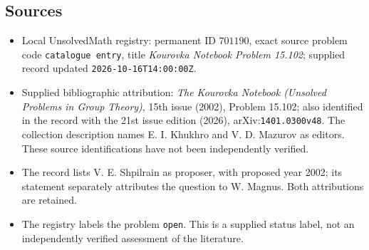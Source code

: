 \documentclass[11pt]{article}
\begin{document}
\subsection{Sources}
\begin{itemize}
\item Local UnsolvedMath registry: permanent ID \(701190\), exact source problem code \texttt{catalogue entry}, title \emph{Kourovka Notebook Problem 15.102}; supplied record updated \texttt{2026-10-16T14:00:00Z}.
\item Supplied bibliographic attribution: \emph{The Kourovka Notebook (Unsolved Problems in Group Theory)}, 15th issue (2002), Problem 15.102; also identified in the record with the 21st issue edition (2026), arXiv:\texttt{1401.0300v48}. The collection description names E. I. Khukhro and V. D. Mazurov as editors. These source identifications have not been independently verified.
\item The record lists V. E. Shpilrain as proposer, with proposed year 2002; its statement separately attributes the question to W. Magnus. Both attributions are retained.
\item The registry labels the problem \texttt{open}. This is a supplied status label, not an independently verified assessment of the literature.
\end{itemize}
\end{document}
